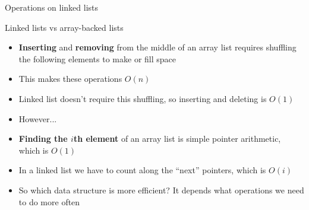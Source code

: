 \begin{frame}{Operations on linked lists}
\end{frame}

\newcommand{\footnoteref}[1]{$^{\text{\ref{#1}}}$}

\begin{frame}{Linked lists vs array-backed lists}
	\begin{itemize}
		\pause\item \textbf{Inserting} and \textbf{removing} from the middle of an array list requires shuffling the following elements to make or fill space
		\pause\item This makes these operations $O(n)$
		\pause\item Linked list doesn't require this shuffling, so inserting and deleting is $O(1)$
		\pause\item However...
		\pause\item \textbf{Finding the $i$th element} of an array list is simple pointer arithmetic, which is $O(1)$
		\pause\item In a linked list we have to count along the ``next'' pointers, which is $O(i)$
		\pause\item So which data structure is more efficient? It depends what operations we need to do more often
	\end{itemize}
\end{frame}
